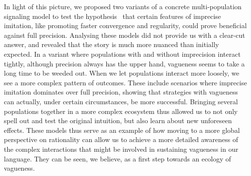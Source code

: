 \documentclass[a4paper]{article}
\begin{document}
In light of this picture, we proposed two variants of a concrete multi-population signaling model to test the hypothesis~\parencite{franke_vagueness_2017} that certain features of imprecise imitation, like promoting faster convergence and regularity, could prove beneficial against full precision.
Analysing these models did not provide us with a clear-cut answer, and revealed that the story is much more nuanced than initially expected.
In a variant where populations with and without imprecision interact tightly, although precision always has the upper hand, vagueness seems to take a long time to be weeded out.
When we let populations interact more loosely, we see a more complex pattern of outcomes.
These include scenarios where imprecise imitation dominates over full precision, showing that strategies with vagueness can actually, under certain circumstances, be more successful.
Bringing several populations together in a more complex ecosystem thus allowed us to not only spell out and test the original intuition, but also learn about new unforeseen effects.
These models thus serve as an example of how moving to a more global perspective on rationality can allow us to achieve a more detailed awareness of the complex interactions that might be involved in sustaining vagueness in our language.
They can be seen, we believe, as a first step towards an ecology of vagueness.


\printbibliography
\end{document}
